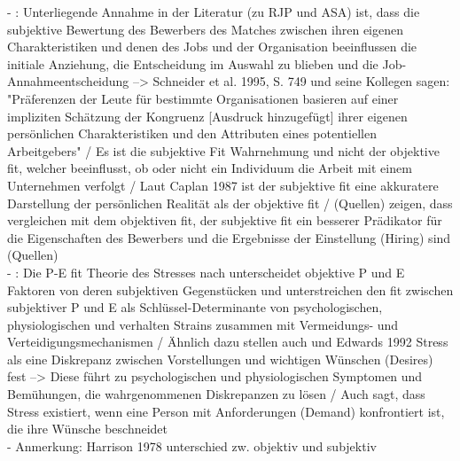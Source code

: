 - \cite[S. 3]{carless:2005}: Unterliegende Annahme in der Literatur (zu RJP und ASA) ist, dass die subjektive Bewertung des Bewerbers des Matches zwischen ihren eigenen Charakteristiken und denen des Jobs und der Organisation beeinflussen die initiale Anziehung, die Entscheidung im Auswahl zu blieben und die Job-Annahmeentscheidung --> Schneider et al. 1995, S. 749 und seine Kollegen sagen: "Präferenzen der Leute für bestimmte Organisationen basieren auf einer impliziten Schätzung der Kongruenz [Ausdruck hinzugefügt] ihrer eigenen persönlichen Charakteristiken und den Attributen eines potentiellen Arbeitgebers" / Es ist die subjektive Fit Wahrnehmung und nicht der objektive fit, welcher beeinflusst, ob oder nicht ein Individuum die Arbeit mit einem Unternehmen verfolgt / Laut Caplan 1987 ist der subjektive fit eine akkuratere Darstellung der persönlichen Realität als der objektive fit / (Quellen) zeigen, dass vergleichen mit dem objektiven fit, der subjektive fit ein besserer Prädikator für die Eigenschaften des Bewerbers und die Ergebnisse der Einstellung (Hiring) sind (Quellen) \\
- \cite[S. 4]{edwards:2017}: Die P-E fit Theorie des Stresses nach \textcite{mechanismsOfJobStressAndStrain:1982} unterscheidet objektive P und E Faktoren von deren subjektiven Gegenstücken und unterstreichen den fit zwischen subjektiver P und E als Schlüssel-Determinante von psychologischen, physiologischen und verhalten Strains zusammen mit Vermeidungs- und Verteidigungsmechanismen / Ähnlich dazu stellen auch \cite{cummings:1979} und Edwards 1992 Stress als eine Diskrepanz zwischen Vorstellungen und wichtigen Wünschen (Desires) fest --> Diese führt zu psychologischen und physiologischen Symptomen und Bemühungen, die wahrgenommenen Diskrepanzen zu lösen / Auch \cite{schuler:1980} sagt, dass Stress existiert, wenn eine Person mit Anforderungen (Demand) konfrontiert ist, die ihre Wünsche beschneidet\\
- Anmerkung: Harrison 1978 unterschied zw. objektiv und subjektiv \\
